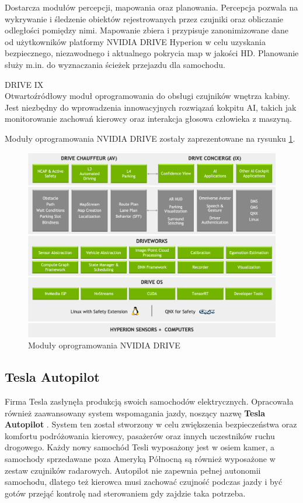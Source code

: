 \begin{enumerate*}
Dostarcza modułów percepcji, mapowania oraz planowania. Percepcja pozwala na wykrywanie i śledzenie obiektów rejestrowanych przez czujniki oraz obliczanie odległości pomiędzy nimi. Mapowanie zbiera i przypisuje zanonimizowane dane od użytkowników platformy NVIDIA DRIVE Hyperion w celu uzyskania bezpiecznego, niezawodnego i aktualnego pokrycia map w jakości HD. Planowanie służy m.in. do wyznaczania ścieżek przejazdu dla samochodu.
\item DRIVE IX \\
Otwartoźródłowy moduł oprogramowania do obsługi czujników wnętrza kabiny. Jest niezbędny do wprowadzenia innowacyjnych rozwiązań kokpitu AI, takich jak monitorowanie zachowań kierowcy oraz interakcja głosowa człowieka z maszyną.
\end{enumerate*}
Moduły oprogramowania NVIDIA DRIVE zostały zaprezentowane na rysunku \ref{NvidiaDriveSDK}.
\newpage
\begin{figure}[h]
\begin{center}
\includegraphics[width=15cm]{resources/figures/nv-drive-sdk.png}
\caption{Moduły oprogramowania NVIDIA DRIVE}
\label{NvidiaDriveSDK}
\end{center}
\end{figure}

\subsection{Tesla Autopilot}
Firma Tesla zasłynęła produkcją swoich samochodów elektrycznych. Opracowała również zaawansowany system wspomagania jazdy, noszący nazwę \textbf{Tesla Autopilot} \cite{tesla:autopilotOverview}. System ten został stworzony w celu zwiększenia bezpieczeństwa oraz komfortu podróżowania kierowcy, pasażerów oraz innych uczestników ruchu drogowego. Każdy nowy samochód Tesli wyposażony jest w osiem kamer, a samochody sprzedawane poza Ameryką Północną są również wyposażone w zestaw czujników radarowych. Autopilot nie zapewnia pełnej autonomii samochodu, dlatego też kierowca musi zachować czujność podczas jazdy i być gotów przejąć kontrolę nad sterowaniem gdy zajdzie taka potrzeba.

